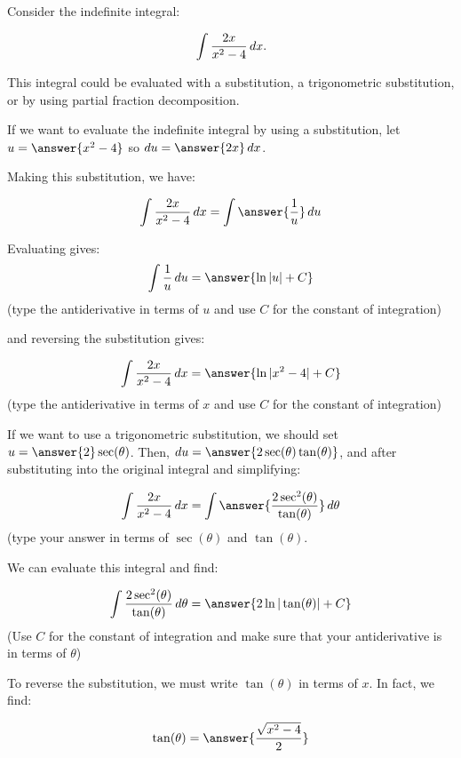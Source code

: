 \documentclass{ximera}
\author{Jim Talamo}
\begin{document}
\begin{exercise}
Consider the indefinite integral: 

\[
\int \frac{2x}{x^2-4} \mathop{}\!d x.
\]

This integral could be evaluated with a substitution, a trigonometric substitution, or by using partial fraction decomposition.

\begin{exercise}
If we want to evaluate the indefinite integral by using a substitution, let $u= \answer{x^2-4}$ so $\d u = \answer{2x} \d x$.

Making this substitution, we have:

\[
\int \frac{2x}{x^2-4} \d x = \int \answer{\frac{1}{u}} \d u
\]
\begin{exercise}
Evaluating gives:
\[
\int\frac{1}{u} \d u = \answer{\ln|u|+C}
\]
(type the antiderivative in terms of $u$ and use $C$ for the constant of integration)

and reversing the substitution gives:

\[
\int \frac{2x}{x^2-4} \d x = \answer{\ln|x^2-4|+C}
\]
(type the antiderivative in terms of $x$ and use $C$ for the constant of integration)
\end{exercise}
\end{exercise}
\begin{exercise}
If we want to use a trigonometric substitution, we should set $u=\answer{2} \sec(\theta)$.  Then, $\d u = \answer{2 \sec(\theta)\tan(\theta)}$, and after substituting into the original integral and simplifying:

\[
\int \frac{2x}{x^2-4} \d x = \int \answer{\frac{2 \sec^2(\theta)}{\tan(\theta)}} \d \theta
\]
(type your answer in terms of $\sec(\theta)$ and $\tan(\theta)$.

\begin{exercise}
We can evaluate this integral and find:

\[
 \int \frac{2 \sec^2(\theta)}{\tan(\theta)} \d \theta = \answer{2 \ln|\tan(\theta)|+C}
\]
(Use $C$ for the constant of integration and make sure that your antiderivative is in terms of $\theta$)

\begin{exercise}

To reverse the substitution, we must write $\tan(\theta)$ in terms of $x$.  In fact, we find:

\[
\tan(\theta) = \answer{\frac{\sqrt{x^2-4}}{2}}
\]


\end{exercise}
\end{exercise}
\end{exercise}
\end{exercise}
\end{document}
